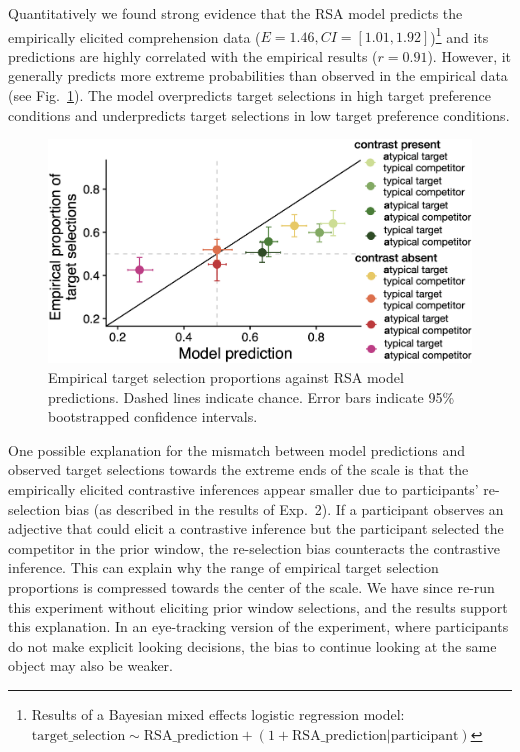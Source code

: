 \documentclass[10pt,letterpaper]{article}
\newcommand{\figref}[1]{Fig.~\ref{#1}}
\begin{document}
Quantitatively we found strong evidence that the RSA model predicts the empirically elicited comprehension data ($E=1.46, CI=[1.01, 1.92]$)\footnote{Results of a Bayesian mixed effects logistic regression model: $\text{target\_selection} \sim \text{RSA\_prediction} + (1+\text{RSA\_prediction}|\text{participant})$} and its predictions are highly correlated with the empirical results ($r=0.91$). However, it generally predicts more extreme probabilities than observed in the empirical data (see \figref{model-results-corr-flatprior}). The model overpredicts target selections in high target preference conditions and underpredicts target selections in low target preference conditions. 

\begin{figure}
	\begin{center}
		\includegraphics[width=.475\textwidth]{graphs/corr-plot.pdf}
	\end{center}
\caption{Empirical target selection proportions  against RSA model predictions. Dashed lines indicate chance. Error bars indicate 95\% bootstrapped confidence intervals.} 
\label{model-results-corr-flatprior}
\end{figure}

One possible explanation for the mismatch between model predictions and observed target selections towards the extreme ends of the scale is that the empirically elicited contrastive inferences appear smaller due to participants' re-selection bias (as described in the results of Exp.~2). If a participant observes an adjective that could elicit a contrastive inference but the participant selected the competitor in the prior window, the re-selection bias counteracts the contrastive inference. This can explain why the range of empirical target selection proportions is compressed towards the center of the scale. We have since re-run this experiment without eliciting prior window selections, and the results support this explanation. In an eye-tracking version of the experiment, where participants do not make explicit looking decisions, the bias to continue looking at the same object may also be weaker.
\end{document}
